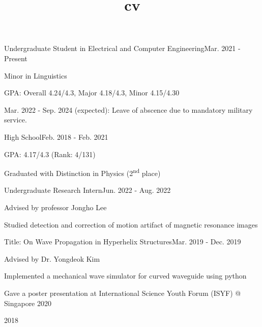\documentclass{cv}
\title{cv}
\begin{document}
\cvheader






{Undergraduate Student in Electrical and Computer Engineering}{Mar. 2021 - Present}
{
    \item Minor in Linguistics
    \item GPA: Overall 4.24/4.3, Major 4.18/4.3, Minor 4.15/4.30
    \item Mar. 2022 - Sep. 2024 (expected): Leave of abscence due to mandatory military service.
}
{High School}{Feb. 2018 - Feb. 2021}
{
    \item GPA: 4.17/4.3 (Rank: 4/131) 
    \item Graduated with Distinction in Physics (2\textsuperscript{nd} place)
}


{Undergraduate Research Intern}{Jun. 2022 - Aug. 2022}
{
    \item Advised by professor Jongho Lee
    \item Studied detection and correction of motion artifact of magnetic resonance images
}

{Title: On Wave Propagation in Hyperhelix Structures}{Mar. 2019 - Dec. 2019}
{
    \item Advised by Dr. Yongdeok Kim
    \item Implemented a mechanical wave simulator for curved waveguide using python %
    \item Gave a poster presentation at International Science Youth Forum (ISYF) @ Singapore 2020
}

 {2018}
\end{document}
